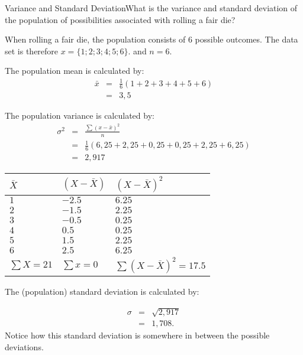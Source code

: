 \begin{wex}{Variance and Standard Deviation}{What is the variance and standard deviation of the population of possibilities associated with rolling a fair die?}
{
When rolling a fair die, the population consists of $6$ possible outcomes. The data set is therefore $x=\{1;2;3;4;5;6\}$. and $n=6$.

The population mean is calculated by:
\begin{eqnarray*}
\bar{x} &=& \frac{1}{6}(1+2+3+4+5+6)\\
&=& 3,5
\end{eqnarray*}

The population variance is calculated by:
\begin{eqnarray*}
\sigma^2&=& \frac{\sum(x-\bar{x})^2}{n}\\
&=&\frac{1}{6} (6,25+2,25+0,25+0,25+2,25+6,25)\\
&=& 2,917
\end{eqnarray*}

\begin{center}
\begin{tabular}{|l|l|l|}
\hline
$\bar{X}$ & $(X - \bar{X})$ & $(X - \bar{X})^2$  \\
\hline
$1$ & $-2.5$ & $6.25$ \\
$2 $& $-1.5 $& $2.25 $\\
$3 $& $-0.5$ & $0.25 $\\
$4 $& $0.5$  & $0.25 $\\
$5$ & $1.5$  & $2.25 $\\
$6$ & $2.5$  & $6.25$ \\
\hline
$\sum{X} = 21$ & $\sum{x} = 0$ & $\sum{(X  - \bar{X})^2} = 17.5$ \\
\hline
\end{tabular}
\end{center}

The (population) standard deviation is calculated by:

\begin{eqnarray*}
\sigma &=& \sqrt{2,917} \\
&=& 1,708.
\end{eqnarray*}
Notice how this standard deviation is somewhere in between the possible deviations.}
\end{wex}

